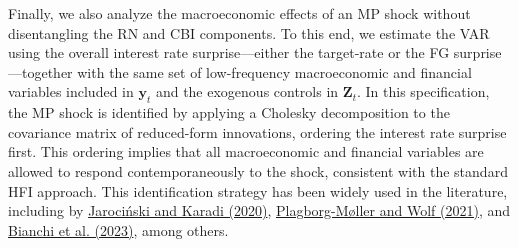 \documentclass[\latexroot/\projectname]{subfiles}
\begin{document}
Finally, we also analyze the macroeconomic effects of an MP shock without disentangling the RN and CBI components. To this end, we estimate the VAR using the overall interest rate surprise—either the target-rate or the FG surprise—together with the same set of low-frequency macroeconomic and financial variables included in $\boldsymbol{y}_t$ and the exogenous controls in $\boldsymbol{Z}_t$. In this specification, the MP shock is identified by applying a Cholesky decomposition to the covariance matrix of reduced-form innovations, ordering the interest rate surprise first. This ordering implies that all macroeconomic and financial variables are allowed to respond contemporaneously to the shock, consistent with the standard HFI approach. This identification strategy has been widely used in the literature, including by \hyperlink{JK (2020)}{Jarociński and Karadi (2020)}, \hyperlink{Plagborg-Møller and Wolf (2021)}{Plagborg-Møller and Wolf (2021)}, and \hyperlink{Bianchi et al. (2023)}{Bianchi et al. (2023)}, among others.
\end{document}
